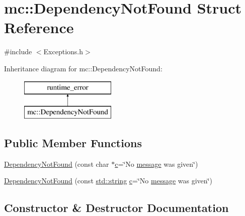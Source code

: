 \hypertarget{structmc_1_1_dependency_not_found}{}\section{mc\+:\+:Dependency\+Not\+Found Struct Reference}
\label{structmc_1_1_dependency_not_found}


{\ttfamily \#include $<$Exceptions.\+h$>$}

Inheritance diagram for mc\+:\+:Dependency\+Not\+Found\+:\begin{figure}[H]
\begin{center}
\leavevmode
\includegraphics[height=2.000000cm]{structmc_1_1_dependency_not_found}
\end{center}
\end{figure}
\subsection*{Public Member Functions}
\begin{DoxyCompactItemize}
\item 
\hyperlink{structmc_1_1_dependency_not_found_a273e86336a035aff0589b7f76cb70e57}{Dependency\+Not\+Found} (const char $\ast$\hyperlink{_s_d_l__opengl__glext_8h_a1f2d7f8147412c43ba2303a56f97ee73}{c}=\char`\"{}No \hyperlink{_s_d_l__opengl__glext_8h_a7b6161cffb9b8aee272b3b916183d28c}{message} was given\char`\"{})
\item 
\hyperlink{structmc_1_1_dependency_not_found_a0c92690d1b7e523117887a0772ee155d}{Dependency\+Not\+Found} (const \hyperlink{_s_d_l__opengl__glext_8h_ae84541b4f3d8e1ea24ec0f466a8c568b}{std\+::string} \hyperlink{_s_d_l__opengl__glext_8h_a1f2d7f8147412c43ba2303a56f97ee73}{c}=\char`\"{}No \hyperlink{_s_d_l__opengl__glext_8h_a7b6161cffb9b8aee272b3b916183d28c}{message} was given\char`\"{})
\end{DoxyCompactItemize}


\subsection{Constructor \& Destructor Documentation}
